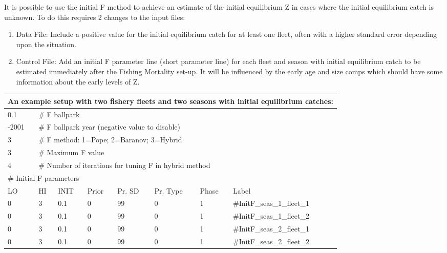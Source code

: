 It is possible to use the initial F method to achieve an estimate of the initial equilibrium Z in cases where the initial equilibrium catch is unknown.  To do this requires 2 changes to the input files:
\begin{enumerate}
	\item Data File: Include a positive value for the initial equilibrium catch for at least one fleet, often with a higher standard error depending upon the situation.
	\item Control File: Add an initial F parameter line (short parameter line) for each fleet and season with initial equilibrium catch to be estimated immediately after the Fishing Mortality set-up.  It will be influenced by the early age and size comps which should have some information about the early levels of Z.
\end{enumerate}

\begin{longtable}{p{1.3cm} p{1.3cm} p{1.3cm} p{1.3cm} p{1.5cm} p{1.5cm} p{1.4cm} p{2.3cm}}
	\multicolumn{8}{l}{An example setup with two fishery fleets and two seasons with initial equilibrium catches:}\\
	\hline
	0.1 & \multicolumn{7}{l}{\# F ballpark}\Tstrut\Bstrut\\
	\hline
	-2001 & \multicolumn{7}{l}{\# F ballpark year (negative value to disable)}\Tstrut\Bstrut\\
	\hline
	3 & \multicolumn{7}{l}{\# F method: 1=Pope; 2=Baranov; 3=Hybrid}\Tstrut\Bstrut\\
	\hline
	3 & \multicolumn{7}{l}{\# Maximum F value}\Tstrut\Bstrut\\
	\hline
	4 & \multicolumn{7}{l}{\# Number of iterations for tuning F in hybrid method}\Tstrut\Bstrut\\
	\hline
	\multicolumn{8}{l}{\# Initial F parameters}\Tstrut\Bstrut\\
	LO & HI & INIT & Prior & Pr. SD & Pr. Type & Phase & Label \Bstrut\\
	\hline
	0 & 3 & 0.1 & 0 & 99 & 0 & 1 & \#InitF\_seas\_1\_fleet\_1\Tstrut\Bstrut\\
	\hline
	0 & 3 & 0.1 & 0 & 99 & 0 & 1 & \#InitF\_seas\_1\_fleet\_2\Tstrut\Bstrut\\
	\hline
	0 & 3 & 0.1 & 0 & 99 & 0 & 1 & \#InitF\_seas\_2\_fleet\_1\Tstrut\Bstrut\\
	\hline
	0 & 3 & 0.1 & 0 & 99 & 0 & 1 & \#InitF\_seas\_2\_fleet\_2\Tstrut\Bstrut\\
	\hline
\end{longtable}


